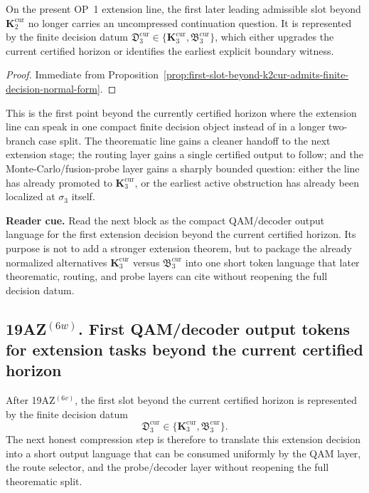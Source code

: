 \begin{corollary}
\label{cor:first-slot-beyond-current-certified-horizon-is-now-decision-normalized}
On the present OP~1 extension line, the first later leading admissible slot beyond $\mathbf K_2^{\mathrm{cur}}$ no longer carries an uncompressed continuation question. It is represented by the finite decision datum $\mathfrak D_3^{\mathrm{cur}}\in\{\mathbf K_3^{\mathrm{cur}},\mathfrak B_3^{\mathrm{cur}}\}$, which either upgrades the current certified horizon or identifies the earliest explicit boundary witness.
\end{corollary}

\begin{proof}
Immediate from Proposition~\ref{prop:first-slot-beyond-k2cur-admits-finite-decision-normal-form}.
\end{proof}

\begin{remark}
\label{rem:what-decision-normal-form-at-sigma3-now-buys}
This is the first point beyond the currently certified horizon where the extension line can speak in one compact finite decision object instead of in a longer two-branch case split. The theorematic line gains a cleaner handoff to the next extension stage; the routing layer gains a single certified output to follow; and the Monte-Carlo/fusion-probe layer gains a sharply bounded question: either the line has already promoted to $\mathbf K_3^{\mathrm{cur}}$, or the earliest active obstruction has already been localized at $\sigma_3$ itself.
\end{remark}




\noindent\textbf{Reader cue.} Read the next block as the compact QAM/decoder output language for the first extension decision beyond the current certified horizon. Its purpose is not to add a stronger extension theorem, but to package the already normalized alternatives \(\mathbf K_3^{\mathrm{cur}}\) versus \(\mathfrak B_3^{\mathrm{cur}}\) into one short token language that later theorematic, routing, and probe layers can cite without reopening the full decision datum.

\subsection*{19AZ$^{(6w)}$. First QAM/decoder output tokens for extension tasks beyond the current certified horizon}
\label{sec:first-qam-decoder-output-tokens-for-extension-tasks-beyond-current-certified-horizon}
After 19AZ$^{(6v)}$, the first slot beyond the current certified horizon is represented by the finite decision datum
\[
  \mathfrak D_3^{\mathrm{cur}}\in\{\mathbf K_3^{\mathrm{cur}},\mathfrak B_3^{\mathrm{cur}}\}.
\]
The next honest compression step is therefore to translate this extension decision into a short output language that can be consumed uniformly by the QAM layer, the route selector, and the probe/decoder layer without reopening the full theorematic split.

